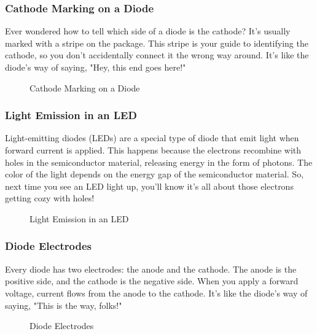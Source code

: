 \subsubsection*{Cathode Marking on a Diode}
Ever wondered how to tell which side of a diode is the cathode? It's usually marked with a stripe on the package. This stripe is your guide to identifying the cathode, so you don't accidentally connect it the wrong way around. It's like the diode's way of saying, "Hey, this end goes here!"

\begin{figure}[h]
    \centering
    \caption{Cathode Marking on a Diode}
    \label{fig:cathode_marking}
\end{figure}

\subsubsection*{Light Emission in an LED}
Light-emitting diodes (LEDs) are a special type of diode that emit light when forward current is applied. This happens because the electrons recombine with holes in the semiconductor material, releasing energy in the form of photons. The color of the light depends on the energy gap of the semiconductor material. So, next time you see an LED light up, you'll know it's all about those electrons getting cozy with holes!

\begin{figure}[h]
    \centering
    \caption{Light Emission in an LED}
    \label{fig:led_light_emission}
\end{figure}

\subsubsection*{Diode Electrodes}
Every diode has two electrodes: the anode and the cathode. The anode is the positive side, and the cathode is the negative side. When you apply a forward voltage, current flows from the anode to the cathode. It's like the diode's way of saying, "This is the way, folks!"

\begin{figure}[h]
    \centering
    \caption{Diode Electrodes}
    \label{fig:diode_electrodes}
\end{figure}

